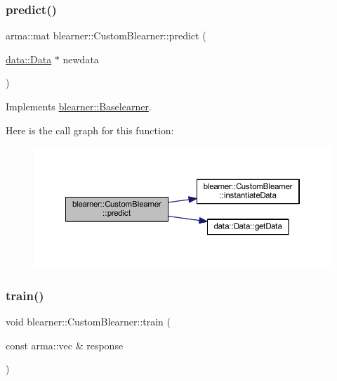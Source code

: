 \subsubsection{\texorpdfstring{predict()}{predict()}\hspace{0.1cm}{\footnotesize\ttfamily [2/2]}}
{\footnotesize\ttfamily arma\+::mat blearner\+::\+Custom\+Blearner\+::predict (\begin{DoxyParamCaption}\item[{\mbox{\hyperlink{classdata_1_1_data}{data\+::\+Data}} $\ast$}]{newdata }\end{DoxyParamCaption})\hspace{0.3cm}{\ttfamily [virtual]}}



Implements \mbox{\hyperlink{classblearner_1_1_baselearner_ae2ef5e018783578e02b3b5a33fa94eae}{blearner\+::\+Baselearner}}.

Here is the call graph for this function\+:
\nopagebreak
\begin{figure}[H]
\begin{center}
\leavevmode
\includegraphics[width=350pt]{classblearner_1_1_custom_blearner_a401a479834eb3896260cb57b4551ceb4_cgraph}
\end{center}
\end{figure}
\mbox{\label{classblearner_1_1_custom_blearner_a4726c5b861b67817f7b3eb61d8f6c0d7}} 
\subsubsection{\texorpdfstring{train()}{train()}}
{\footnotesize\ttfamily void blearner\+::\+Custom\+Blearner\+::train (\begin{DoxyParamCaption}\item[{const arma\+::vec \&}]{response }\end{DoxyParamCaption})\hspace{0.3cm}{\ttfamily [virtual]}}



